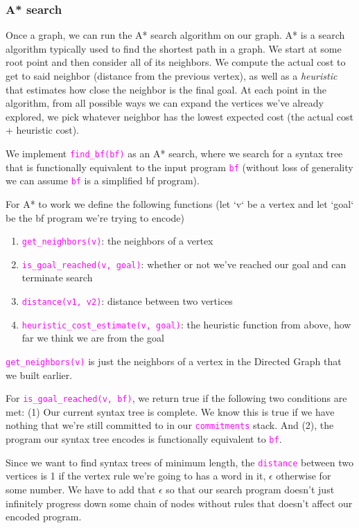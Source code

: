 \documentclass[runningheads]{llncs}
\newcommand{\code}[1]{\texttt{\textcolor{magenta}{\setlength{\fboxsep}{1pt}\colorbox{lightgray!20}{#1}}}}
\begin{document}
\subsubsection*{A* search}
Once a graph, we can run the A* search algorithm on our graph. A* is a search algorithm typically used to find the shortest path in a graph. We start at some root point and then consider all of its neighbors. We compute the actual cost to get to said neighbor (distance from the previous vertex), as well as a \textit{heuristic} that estimates how close the neighbor is the final goal. At each point in the algorithm, from all possible ways we can expand the vertices we've already explored, we pick whatever neighbor has the lowest expected cost (the actual cost + heuristic cost).

We implement \code{find\_bf(bf)} as an A* search, where we search for a syntax tree that is functionally equivalent to the input program \code{bf} (without loss of generality we can assume \code{bf} is a simplified bf program).

For A* to work we define the following functions (let `v` be a vertex and let `goal` be the bf program we're trying to encode)
\begin{enumerate}
	\item \code{get\_neighbors(v)}: the neighbors of a vertex
	\item \code{is\_goal\_reached(v, goal)}: whether or not we've reached our goal and can terminate search
	\item \code{distance(v1, v2)}: distance between two vertices
	\item \code{heuristic\_cost\_estimate(v, goal)}: the heuristic function from above, how far we think we are from the goal
\end{enumerate}


\code{get\_neighbors(v)} is just the neighbors of a vertex in the Directed Graph that we built earlier.

For \code{is\_goal\_reached(v, bf)}, we return true if the following two conditions are met: (1) Our current syntax tree is complete. We know this is true if we have nothing that we're still committed to in our \code{commitments} stack. And (2), the program our syntax tree encodes is functionally equivalent to \code{bf}.

Since we want to find syntax trees of minimum length, the \code{distance} between two vertices is 1 if the vertex rule we're going to has a word in it, $\epsilon$ otherwise for some number. We have to add that $\epsilon$ so that our search program doesn't just infinitely progress down some chain of nodes without rules that doesn't affect our encoded program.
\end{document}
